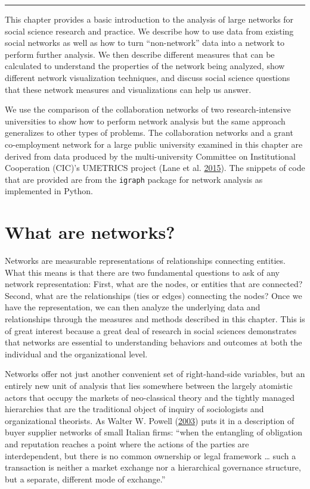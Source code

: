 \documentclass[]{krantz}
\begin{document}
\begin{center}\rule{0.5\linewidth}{\linethickness}\end{center}

This chapter provides a basic introduction to the analysis of large
networks for social science research and practice. We describe how to
use data from existing social networks as well as how to turn
``non-network'' data into a network to perform further analysis. We then
describe different measures that can be calculated to understand the
properties of the network being analyzed, show different network
visualization techniques, and discuss social science questions that
these network measures and visualizations can help us answer.

We use the comparison of the collaboration networks of two
research-intensive universities to show how to perform network analysis
but the same approach generalizes to other types of problems. The
collaboration networks and a grant co-employment network for a large
public university examined in this chapter are derived from data
produced by the multi-university Committee on Institutional Cooperation
(CIC)'s UMETRICS project (Lane et al.
\protect\hyperlink{ref-lane2015new}{2015}). The snippets of code that
are provided are from the \texttt{igraph} package for network analysis
as implemented in Python.

\section{What are networks?}\label{what-are-networks}

Networks are measurable representations of relationships connecting
entities. What this means is that there are two fundamental questions to
ask of any network representation: First, what are the nodes, or
entities that are connected? Second, what are the relationships (ties or
edges) connecting the nodes? Once we have the representation, we can
then analyze the underlying data and relationships through the measures
and methods described in this chapter. This is of great interest because
a great deal of research in social sciences demonstrates that networks
are essential to understanding behaviors and outcomes at both the
individual and the organizational level.

Networks offer not just another convenient set of right-hand-side
variables, but an entirely new unit of analysis that lies somewhere
between the largely atomistic actors that occupy the markets of
neo-classical theory and the tightly managed hierarchies that are the
traditional object of inquiry of sociologists and organizational
theorists. As Walter W. Powell
(\protect\hyperlink{ref-powell2003neither}{2003}) puts it in a
description of buyer supplier networks of small Italian firms: ``when
the entangling of obligation and reputation reaches a point where the
actions of the parties are interdependent, but there is no common
ownership or legal framework \ldots{} such a transaction is neither a
market exchange nor a hierarchical governance structure, but a separate,
different mode of exchange.''
\end{document}
